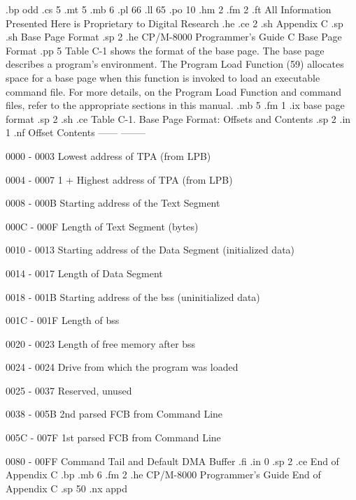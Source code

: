 .bp odd
.cs 5
.mt 5
.mb 6
.pl 66
.ll 65
.po 10
.hm 2
.fm 2
.ft All Information Presented Here is Proprietary to Digital Research
.he
.ce 2
.sh
Appendix C
.sp
.sh
Base Page Format
.sp 2
.he CP/M-8000 Programmer's Guide                   C  Base Page Format
.pp 5
Table C-1 shows the format of the base page.  The base page 
describes a program's environment.  The Program Load Function 
(59) allocates space for a base page when this function is 
invoked to load an executable command file.  For more details,
on the Program Load Function and command files, refer to the 
appropriate sections in this manual.
.mb 5
.fm 1
.ix base page format
.sp 2
.sh
.ce 
Table C-1. Base Page Format:  Offsets and Contents 
.sp 2
.in 1
.nf
      Offset                          Contents
      ------                          --------

    0000 - 0003            Lowest address of TPA (from LPB) 

    0004 - 0007            1 + Highest address of TPA 
                           (from LPB)          

    0008 - 000B            Starting address of the Text 
                           Segment

    000C - 000F            Length of Text Segment (bytes)

    0010 - 0013            Starting address of the Data 
                           Segment (initialized data)

    0014 - 0017            Length of Data Segment

    0018 - 001B            Starting address of the bss 
                           (uninitialized data)

    001C - 001F            Length of bss 

    0020 - 0023            Length of free memory after bss

    0024 - 0024            Drive from which the program was 
                           loaded

    0025 - 0037            Reserved, unused

    0038 - 005B            2nd parsed FCB from Command Line

    005C - 007F            1st parsed FCB from Command Line

    0080 - 00FF            Command Tail and Default DMA
                           Buffer
.fi
.in 0
.sp 2
.ce
End of Appendix C
.bp
.mb 6
.fm 2
.he CP/M-8000 Programmer's Guide                     End of Appendix C
.sp 50
.nx appd


